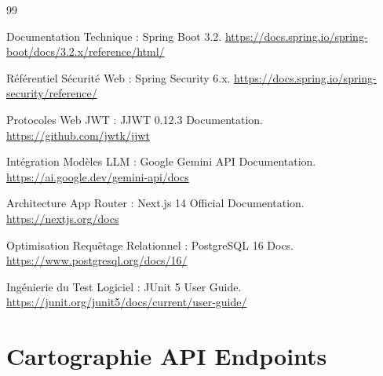 \documentclass[12pt,a4paper,oneside]{book} %
\begin{document}
\begin{thebibliography}{99}

 Documentation Technique : Spring Boot 3.2. \url{https://docs.spring.io/spring-boot/docs/3.2.x/reference/html/}

 Référentiel Sécurité Web : Spring Security 6.x. \url{https://docs.spring.io/spring-security/reference/}

 Protocoles Web JWT : JJWT 0.12.3 Documentation. \url{https://github.com/jwtk/jjwt}

 Intégration Modèles LLM : Google Gemini API Documentation. \url{https://ai.google.dev/gemini-api/docs}

 Architecture App Router : Next.js 14 Official Documentation. \url{https://nextjs.org/docs}

 Optimisation Requêtage Relationnel : PostgreSQL 16 Docs. \url{https://www.postgresql.org/docs/16/}

 Ingénierie du Test Logiciel : JUnit 5 User Guide. \url{https://junit.org/junit5/docs/current/user-guide/}

\end{thebibliography}

\appendix
\clearpage
\chapter{Cartographie API Endpoints}
\end{document}
